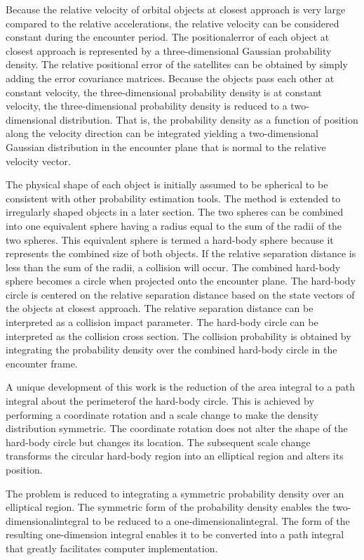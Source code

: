 \documentclass[10pt]{article}
\begin{document}
Because the relative velocity of orbital objects at closest approach is very large compared to the relative accelerations, the relative velocity can be considered constant during the encounter period. The positionalerror of each object at closest approach is represented by a three-dimensional Gaussian probability density. The relative positional error of the satellites can be obtained by simply adding the error covariance matrices. Because the objects pass each other at constant velocity, the three-dimensional probability density is at constant velocity, the three-dimensional probability density is reduced to a two-dimensional distribution. That is, the probability density as a function of position along the velocity direction can be integrated yielding a two-dimensional Gaussian distribution in the encounter plane that is normal to the relative velocity vector.

The physical shape of each object is initially assumed to be spherical to be consistent with other probability estimation tools. The method is extended to irregularly shaped objects in a later section. The two spheres can be combined into one equivalent sphere having a radius equal to the sum of the radii of the two spheres. This equivalent sphere is termed a hard-body sphere because it represents the combined size of both objects. If the relative separation distance is less than the sum of the radii, a collision will occur. The combined hard-body sphere becomes a circle when projected onto the encounter plane. The hard-body circle is centered on the relative separation distance based on the state vectors of the objects at closest approach. The relative separation distance can be interpreted as a collision impact parameter. The hard-body circle can be interpreted as the collision cross section. The collision probability is obtained by integrating the probability density over the combined hard-body circle in the encounter frame.

A unique development of this work is the reduction of the area integral to a path integral about the perimeterof the hard-body circle. This is achieved by performing a coordinate rotation and a scale change to make the density distribution symmetric. The coordinate rotation does not alter the shape of the hard-body circle but changes its location. The subsequent scale change transforms the circular hard-body region into an elliptical region and alters its position.

The problem is reduced to integrating a symmetric probability density over an elliptical region. The symmetric form of the probability density enables the two-dimensionalintegral to be reduced to a one-dimensionalintegral. The form of the resulting one-dimension integral enables it to be converted into a path integral that greatly facilitates computer implementation.
\end{document}
